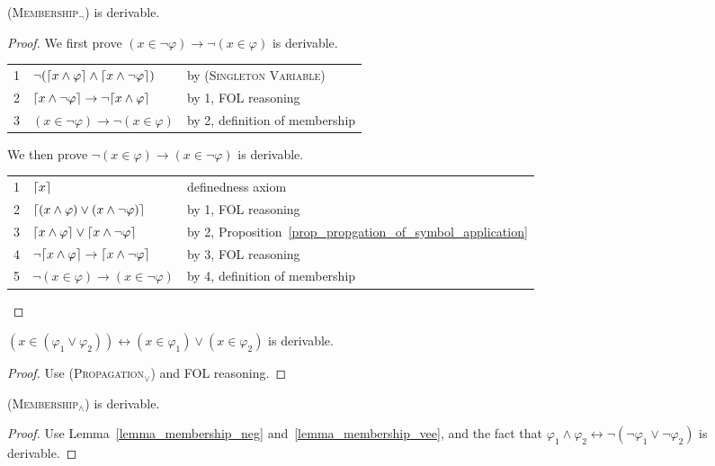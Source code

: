 \documentclass[acmsmall]{acmart}
\theoremstyle{acmdefinition}
\newcommand{\imp}{\to}
\newcommand{\dimp}{\leftrightarrow}
\newcommand{\prule}[1]{\textsc{(#1)}}
\newcommand{\singletonvariable}{\prule{Singleton Variable}\xspace}
\newcommand{\propagationvee}{\prule{Propagation$_\vee$}\xspace}
\newcommand{\membershipneg}{\prule{Membership$_\neg$}\xspace}
\newcommand{\membershipwedge}{\prule{Membership$_\wedge$}\xspace}
\DeclarePairedDelimiter{\ceil}{\lceil}{\rceil}
\newcommand{\Prop}[1]{Proposition~\ref{#1}}
\begin{document}
\begin{lemma}
	\label{lemma_membership_neg}
	\membershipneg is derivable.
\end{lemma}
\begin{proof}
We first prove $(x \in \neg \varphi) \imp \neg (x \in \varphi)$ is derivable.
\begin{center}
	\begin{tabular}{l|ll}
		1 & $\neg (\ceil{x \wedge \varphi} \wedge 
		           \ceil{x \wedge \neg \varphi})$ 
		  & by \singletonvariable \\
		2 & $\ceil{x \wedge \neg \varphi} \imp \neg \ceil{x \wedge \varphi}$
	      & by 1, FOL reasoning \\
		3 & $(x \in \neg \varphi) \imp \neg (x \in \varphi)$
		  & by 2, definition of membership
	\end{tabular}
\end{center}
We then prove
$\neg (x \in \varphi) \imp (x \in \neg \varphi)$ is derivable.
\begin{center}
	\begin{tabular}{l|ll}
		1 & $\ceil{x}$ & definedness axiom \\
		2 & $\ceil{(x \wedge \varphi) \vee (x \wedge \neg \varphi)}$
		  & by 1, FOL reasoning \\
		3 & $\ceil{x \wedge \varphi} \vee \ceil{x \wedge \neg \varphi}$
		  & by 2, \Prop{prop_propgation_of_symbol_application} \\
		4 & $ \neg \ceil {x \wedge \varphi} \imp \ceil{x \wedge \neg \varphi}$
		  & by 3, FOL reasoning \\
		5 & $ \neg (x \in \varphi) \imp (x \in \neg \varphi)$
		  & by 4, definition of membership
	\end{tabular}
\end{center}
\end{proof}

\begin{lemma}
\label{lemma_membership_vee}
	$(x \in (\varphi_1 \vee \varphi_2)) \dimp 
	 (x \in \varphi_1) \vee (x \in \varphi_2)$ 
	 is derivable.
\end{lemma}
\begin{proof}
	Use \propagationvee and FOL reasoning.
\end{proof}

\begin{lemma}
	\membershipwedge is derivable.
\end{lemma}
\begin{proof}
Use Lemma~\ref{lemma_membership_neg} and~\ref{lemma_membership_vee},
and the fact that
$\varphi_1 \wedge \varphi_2 \dimp \neg (\neg \varphi_1 \vee \neg \varphi_2)$
 is derivable.
\end{proof}
\end{document}
